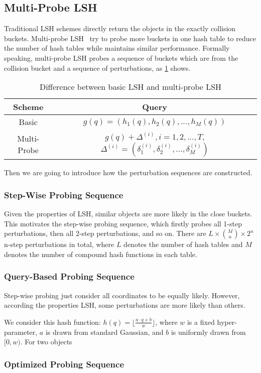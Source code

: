 \subsection{Multi-Probe LSH}
Traditional LSH schemes directly return the objects in the exactly collision buckets.
Multi-probe LSH~\cite{lv2007multi} try to probe more buckets in one hash table to reduce the number of hash tables while maintains similar performance.
Formally speaking, multi-probe LSH probes a sequence of buckets which are from the collision bucket and a sequence of perturbations, as \cref{tbl:multi-probe-lsh} shows.
\begin{table}[hbt]
\centering
\caption{Difference between basic LSH and multi-probe LSH}
\begin{tabular}{|c|c|}
\hline
  \textbf{Scheme} & \textbf{Query}\\ \hline
  Basic& $g(q)=(h_1(q), h_2(q), ..., h_M(q))$ \\ \hline
  Multi-Probe& $g(q){+}\Delta^{(i)}, i{=}1,2,...,T$, $\Delta^{(i)}{=}(\delta_1^{(i)}, \delta_2^{(i)}, ..., \delta_M^{(i)})$ \\ \hline
\end{tabular}
\label{tbl:multi-probe-lsh}
\end{table}

Then we are going to introduce how the perturbation sequences are constructed.
\subsubsection{Step-Wise Probing Sequence}
Given the properties of LSH, similar objects are more likely in the close buckets.
This motivates the step-wise probing sequence, which firstly probes all 1-step perturbations, then all 2-step perturbations, and so on.
There are $L{\times} {M\choose n} {\times} 2^{n}$ n-step perturbations in total, where $L$ denotes the number of hash tables and $M$ denotes the number of compound hash functions in each table.

\subsubsection{Query-Based Probing Sequence}
Step-wise probing just consider all coordinates to be equally likely.
However, according the properties LSH, some perturbations are more likely than others.

We consider this hash function: $h(q)=\lfloor\frac{a\cdot q + b}{w}\rfloor$, where $w$ is a fixed hyper-parameter, $a$ is drawn from standard Gaussian, and $b$ is uniformly drawn from $[0, w)$.
For two objects $$

\subsubsection{Optimized Probing Sequence}